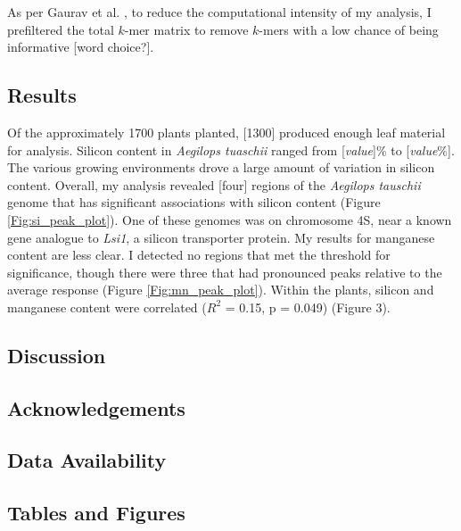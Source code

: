 \documentclass[12pt, letterpaper, ]{article}
\begin{document}
As per Gaurav et al. , to reduce the computational intensity of my analysis, I prefiltered the total $k$-mer matrix to remove $k$-mers with a low chance of being informative [word choice?]. 

\subsection{Results}

Of the approximately 1700 plants planted, [1300] produced enough leaf material for analysis. Silicon content in \textit{Aegilops tuaschii} ranged from [\textit{value}]\% to [\textit{value}\%]. The various growing environments drove a large amount of variation in silicon content. Overall, my analysis revealed [four] regions of the \textit{Aegilops tauschii} genome that has significant associations with silicon content (Figure \ref{Fig:si_peak_plot}). One of these genomes was on chromosome 4S, near a known gene analogue to \textit{Lsi1}, a silicon transporter protein. My results for manganese content are less clear. I detected no regions that met the threshold for significance, though there were three that had pronounced peaks relative to the average response (Figure \ref{Fig:mn_peak_plot}). Within the plants, silicon and manganese content were correlated ($R^2$ = 0.15, p = 0.049) (Figure 3). 

\subsection{Discussion}

\subsection{Acknowledgements}

\subsection{Data Availability}

\subsection{Tables and Figures}
\end{document}
